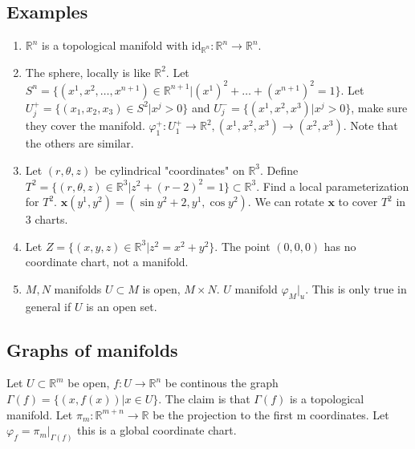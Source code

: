 \documentclass[a4paper]{article}
\begin{document}
\subsection*{Examples}
\begin{enumerate}
    \item
    $\mathds{R}^n$ is a topological manifold with $\text{id}_{\mathds{R}^n}: \mathds{R}^n \rightarrow \mathds{R}^n$. 
    \item
        The sphere, locally is like $\mathds{R}^2$. Let $S^n = \{(x^1, x^2, \dots, x^{n+1}) \in \mathds{R}^{n+1} | (x^1)^2 + \dots + (x^{n+1})^2 = 1\}$. Let $U_j^+  = \{(x_1, x_2, x_3) \in S^2 | x^j > 0\}$ and $U_j^- = \{(x^1, x^2, x^3) | x^j > 0\}$, make sure they cover the manifold. $\varphi_1^+: U_1^+ \rightarrow \mathds{R}^2, (x^1, x^2, x^3) \rightarrow (x^2, x^3)$. Note that the others are similar.
    \item Let $(r, \theta, z)$ be cylindrical "coordinates" on $\mathds{R}^3$. Define $T^2 = \{(r,\theta, z) \in \mathds{R}^3 | z^2 + (r-2)^2 = 1\} \subset \mathds{R}^3$. Find a local parameterization for $T^2$. $\mathbf{x}(y^1,y^2) = (\sin y^2 + 2,y^1, \cos y^2)$. We can rotate $\mathbf{x}$ to cover $T^2$ in 3 charts.
    \item Let $Z = \{(x,y,z) \in \mathds{R}^3 | z^2 = x^2 + y^2\}.$ The point $(0,0,0)$ has no coordinate chart, not a manifold.
    \item $M,N$ manifolds $U \subset M$  is open, $M \times N$. $U$ manifold  $\varphi_M|_u$. This is only true in general if $U$ is an open set.
\end{enumerate}

\subsection*{Graphs of manifolds}
Let $U \subset \mathds{R}^m$ be open, $f: U \rightarrow \mathds{R}^n$ be continous the graph $\Gamma(f) = \{(x, f(x)) | x \in U\}$. The claim is that $\Gamma(f)$ is a topological manifold. Let $\pi_m : \mathds{R}^{m+n} \rightarrow \mathds{R}$ be the projection to the first m coordinates. Let $\varphi_f = \pi_m |_{\Gamma(f)}$ this is a global coordinate chart.
\end{document}
